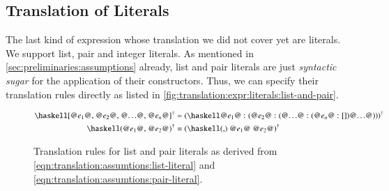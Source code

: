 \subsection{Translation of Literals} \label{sec:translation:expr:literals}
The last kind of expression whose translation we did not cover yet are literals.
We support list, pair and integer literals.
As mentioned in \autoref{sec:preliminaries:assumptions} already, list and pair literals are just \textit{syntactic sugar} for the application of their constructors.
Thus, we can specify their translation rules directly as listed in \autoref{fig:translation:expr:literals:list-and-pair}.

\begin{figure}[H]
  \begin{align*}
    \toCoq{\haskellM{[@$e_1$@, @$e_2$@, @$\ldots$@, @$e_n$@]}}
    &= \toCoq{(\haskellM{@$e_1$@ : (@$e_2$@ : (@$\ldots$@ : (@$e_n$@ : [])@$\ldots$@))})}
    \\
    \toCoq{\haskellM{(@$e_1$@, @$e_2$@)}}
    &= \toCoq{(\haskellM{(,) @$e_1$@ @$e_2$@})}
  \end{align*}
  \caption{Translation rules for list and pair literals as derived from \autoref{eqn:translation:assumtions:list-literal} and \autoref{eqn:translation:assumtions:pair-literal}.}
  \label{fig:translation:expr:literals:list-and-pair}
\end{figure}

